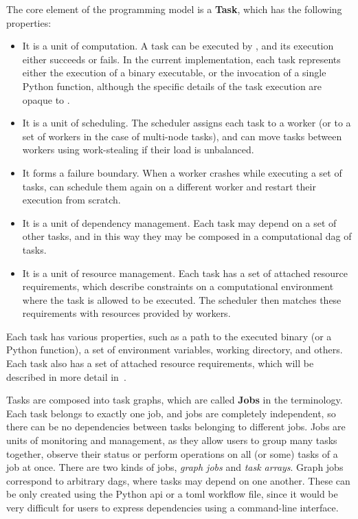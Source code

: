 The core element of the programming model is a \textbf{Task}, which has the following
properties:
\begin{itemize}
	\item It is a unit of computation. A task can be executed by \hq{}, and its execution
	      either succeeds or fails. In the current implementation, each task represents either the execution
	      of a binary executable, or the invocation of a single Python function, although the specific
	      details of the task execution are opaque to \hyperqueue{}.
	\item It is a unit of scheduling. The \hq{} scheduler assigns each task to a worker (or
	      to a set of workers in the case of multi-node tasks), and can move tasks between workers using
	      work-stealing if their load is unbalanced.
	\item It forms a failure boundary. When a worker crashes while executing a set of tasks,
	      \hq{} can schedule them again on a different worker and restart their execution
	      from scratch.
	\item It is a unit of dependency management. Each task may depend on a set of other tasks, and in this
	      way they may be composed in a computational \gls{dag} of tasks.
	\item It is a unit of resource management. Each task has a set of attached resource requirements, which
	      describe constraints on a computational environment where the task is allowed to be executed. The
	      \hq{} scheduler then matches these requirements with resources provided by
	      workers.
\end{itemize}

Each task has various properties, such as a path to the executed binary (or a Python function), a
set of environment variables, working directory, and others. Each task also has a set of attached
resource requirements, which will be described in more detail in~.

Tasks are composed into task graphs, which are called \textbf{Jobs} in the
\hq{} terminology. Each task belongs to exactly one job, and jobs are completely
independent, so there can be no dependencies between tasks belonging to different jobs. Jobs are
units of monitoring and management, as they allow users to group many tasks together, observe their
status or perform operations on all (or some) tasks of a job at once. There are two kinds of jobs,
\emph{graph jobs} and \emph{task arrays}. Graph jobs correspond to arbitrary
\glspl{dag}, where tasks may depend on one another. These can be only created using the
Python \gls{api} or a \gls{toml} workflow file, since it would be very
difficult for users to express dependencies using a command-line interface.

